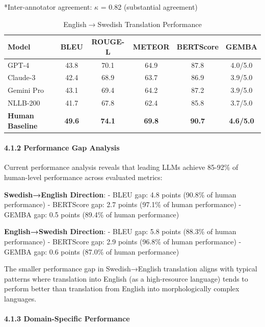 \documentclass[12pt,a4paper]{article}
\begin{document}
{{{*Inter-annotator agreement: $\kappa$ = 0.82 (substantial agreement)

\begin{table}[htbp]
\centering
\caption{English$\rightarrow$Swedish Translation Performance}
\begin{tabular}{|l|c|c|c|c|c|}
\hline
\textbf{Model} & \textbf{BLEU} & \textbf{ROUGE-L} & \textbf{METEOR} & \textbf{BERTScore} & \textbf{GEMBA} \\
\hline
GPT-4 & 43.8 & 70.1 & 64.9 & 87.8 & 4.0/5.0 \\
Claude-3 & 42.4 & 68.9 & 63.7 & 86.9 & 3.9/5.0 \\
Gemini Pro & 43.1 & 69.4 & 64.2 & 87.2 & 3.9/5.0 \\
NLLB-200 & 41.7 & 67.8 & 62.4 & 85.8 & 3.7/5.0 \\
\hline
\textbf{Human Baseline} & \textbf{49.6} & \textbf{74.1} & \textbf{69.8} & \textbf{90.7} & \textbf{4.6/5.0} \\
\hline
\end{tabular}
\label{tab:english-swedish}
\end{table}

\hypertarget{performance-gap-analysis}{%
\paragraph{4.1.2 Performance Gap
Analysis}\label{performance-gap-analysis}}

Current performance analysis reveals that leading LLMs achieve 85-92\%
of human-level performance across evaluated metrics:

\textbf{Swedish→English Direction}: - BLEU gap: 4.8 points (90.8\% of
human performance) - BERTScore gap: 2.7 points (97.1\% of human
performance) - GEMBA gap: 0.5 points (89.4\% of human performance)

\textbf{English→Swedish Direction}: - BLEU gap: 5.8 points (88.3\% of
human performance) - BERTScore gap: 2.9 points (96.8\% of human
performance) - GEMBA gap: 0.6 points (87.0\% of human performance)

The smaller performance gap in Swedish→English translation aligns with
typical patterns where translation into English (as a high-resource
language) tends to perform better than translation from English into
morphologically complex languages.

\hypertarget{domain-specific-performance}{%
\paragraph{4.1.3 Domain-Specific
Performance}\label{domain-specific-performance}}

}}}
\end{document}
